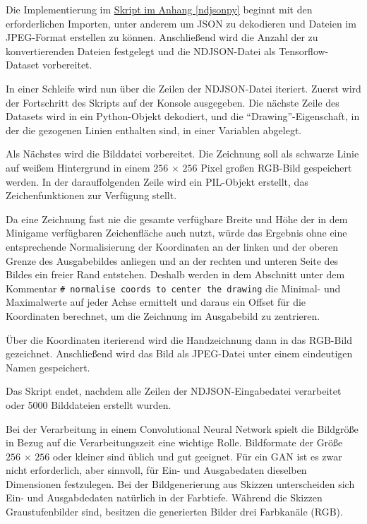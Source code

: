 Die Implementierung im \hyperref[ndjsonpy]{Skript im Anhang \ref{ndjsonpy}} beginnt mit den erforderlichen Importen, unter anderem um JSON zu dekodieren und Dateien im JPEG-Format erstellen zu können. Anschließend wird die Anzahl der zu konvertierenden Dateien festgelegt und die NDJSON-Datei als Tensorflow-Dataset vorbereitet.

In einer Schleife wird nun über die Zeilen der NDJSON-Datei iteriert. Zuerst wird der Fortschritt des Skripts auf der Konsole ausgegeben. Die nächste Zeile des Datasets wird in ein Python-Objekt dekodiert, und die ``Drawing''-Eigenschaft, in der die gezogenen Linien enthalten sind, in einer Variablen abgelegt.

Als Nächstes wird die Bilddatei vorbereitet. Die Zeichnung soll als schwarze Linie auf weißem Hintergrund in einem $256\,\times\,256$ Pixel großen RGB-Bild gespeichert werden. In der darauffolgenden Zeile wird ein PIL-Objekt erstellt, das Zeichenfunktionen zur Verfügung stellt.

Da eine Zeichnung fast nie die gesamte verfügbare Breite und Höhe der in dem Minigame verfügbaren Zeichenfläche auch nutzt, würde das Ergebnis ohne eine entsprechende Normalisierung der Koordinaten an der linken und der oberen Grenze des Ausgabebildes anliegen und an der rechten und unteren Seite des Bildes ein freier Rand entstehen. Deshalb werden in dem Abschnitt unter dem Kommentar \lstinline{# normalise coords to center the drawing} die Minimal- und Maximalwerte auf jeder Achse ermittelt und daraus ein Offset für die Koordinaten berechnet, um die Zeichnung im Ausgabebild zu zentrieren.

Über die Koordinaten iterierend wird die Handzeichnung dann in das RGB-Bild gezeichnet. Anschließend wird das Bild als JPEG-Datei unter einem eindeutigen Namen gespeichert.

Das Skript endet, nachdem alle Zeilen der NDJSON-Eingabedatei verarbeitet oder 5000 Bilddateien erstellt wurden.

Bei der Verarbeitung in einem Convolutional Neural Network spielt die Bildgröße
in Bezug auf die Verarbeitungszeit eine wichtige Rolle. Bildformate der Größe $256\,\times\,256$ oder kleiner sind üblich und gut geeignet. Für ein GAN ist es zwar nicht erforderlich, aber sinnvoll, für Ein- und Ausgabedaten dieselben Dimensionen festzulegen. Bei der Bildgenerierung aus Skizzen unterscheiden sich Ein- und Ausgabdedaten natürlich in der Farbtiefe. Während die Skizzen Graustufenbilder sind, besitzen die generierten Bilder drei Farbkanäle (RGB).

